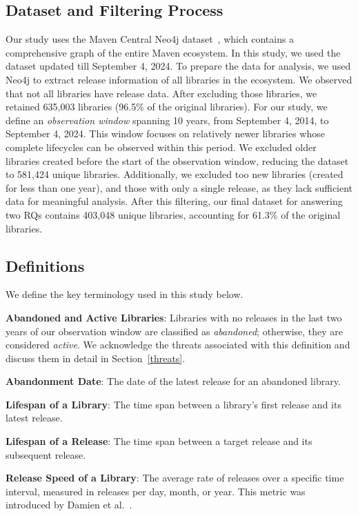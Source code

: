 \subsection{Dataset and Filtering Process}
Our study uses the Maven Central Neo4j dataset~\cite{msrdata,10.1145/3643991.3644879}, which contains a comprehensive graph of the entire Maven ecosystem. In this study, we used the dataset updated till September 4, 2024. To prepare the data for analysis, we used Neo4j to extract release information of all libraries in the ecosystem. We observed that not all libraries have release data. After excluding those libraries, we retained 635,003 libraries (96.5\% of the original libraries). For our study, we define an \textit{observation window} spanning 10 years, from September 4, 2014, to September 4, 2024. This window focuses on relatively newer libraries whose complete lifecycles can be observed within this period. We excluded older libraries created before the start of the observation window, reducing the dataset to 581,424 unique libraries. Additionally, we excluded too new libraries (created for less than one year), and those with only a single release, as they lack sufficient data for meaningful analysis. After this filtering, our final dataset for answering two RQs contains 403,048 unique libraries, accounting for 61.3\% of the original libraries.


\subsection{Definitions}
We define the key terminology used in this study below.

\noindent \textbf{Abandoned and Active Libraries}: Libraries with no releases in the last two years of our observation window are classified as \textit{abandoned}; otherwise, they are considered \textit{active}. We acknowledge the threats associated with this definition and discuss them in detail in Section~\ref{threats}.

\noindent \textbf{Abandonment Date}: The date of the latest release for an abandoned library.

\noindent \textbf{Lifespan of a Library}: The time span between a library's first release and its latest release.

\noindent \textbf{Lifespan of a Release}: The time span between a target release and its subsequent release.

\noindent \textbf{Release Speed of a Library}: The average rate of releases over a specific time interval, measured in releases per day, month, or year. This metric was introduced by Damien et al.~\cite{jaime2022preliminary}.


